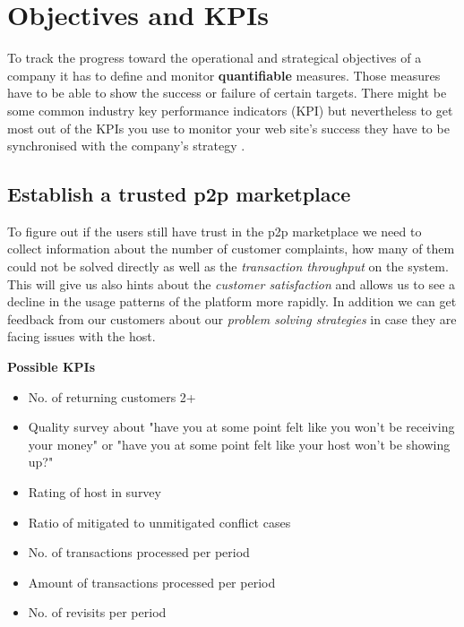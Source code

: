 \section{Objectives and KPIs} %
\label{sec:obj_kpis}

To track the progress toward the operational and strategical objectives of a company it has to define and monitor {\bf quantifiable} measures. Those measures have to be able to show the success or failure of certain targets. There might be some common industry key performance indicators (KPI) but nevertheless to get most out of the KPIs you use to monitor your web site's success they have to be synchronised with the company's strategy \citep[p. 347-349]{Kaushik07}.

\subsection{Establish a trusted p2p marketplace}
To figure out if the users still have trust in the p2p marketplace we need to collect information about the number of customer complaints, how many of them could not be solved directly as well as the \textit{transaction throughput} on the system. This will give us also hints about the \textit{customer satisfaction} and allows us to see a decline in the usage patterns of the platform more rapidly. In addition we can get feedback from our customers about our \textit{problem solving strategies} in case they are facing issues with the host. 

\begin{description}
	\item \textbf{Possible KPIs}
	\begin{itemize}
    	\item No. of returning customers 2+
        \item Quality survey about "have you at some point felt like you won't be receiving your money" or "have you at some point felt like your host won't be showing up?"
        \item Rating of host in survey
        \item Ratio of mitigated to unmitigated conflict cases
        \item No. of transactions processed per period
        \item Amount of transactions processed per period
        \item No. of revisits per period
    \end{itemize}
\end{description}

